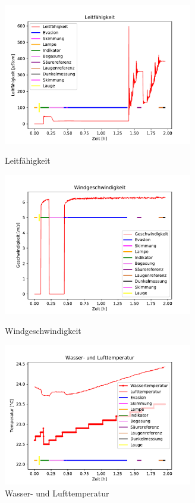 \documentclass[12pt]{article}
\begin{document}
\begin{figure}[H]
	\centering
	\parbox{82.5mm}{
		\centering
		\includegraphics[width=82.5mm]{Meerwasser/Leitfaehigkeit}
		\caption{Leitf\"ahigkeit \label{fig: Meermodellwasser}}
	}
	\hfill%
	\parbox{82.5mm}{
		\centering
		\includegraphics[width=82.5mm]{Meerwasser/Windgeschwindigkeit}
		\caption{Windgeschwindigkeit}
	}
	\centering
	\parbox{82.5mm}{
		\centering
		\includegraphics[width=82.5mm]{Meerwasser/Wassertemperatur}
		\caption{Wasser- und Lufttemperatur}
	}
	\hfill%

\end{figure}
\end{document}

